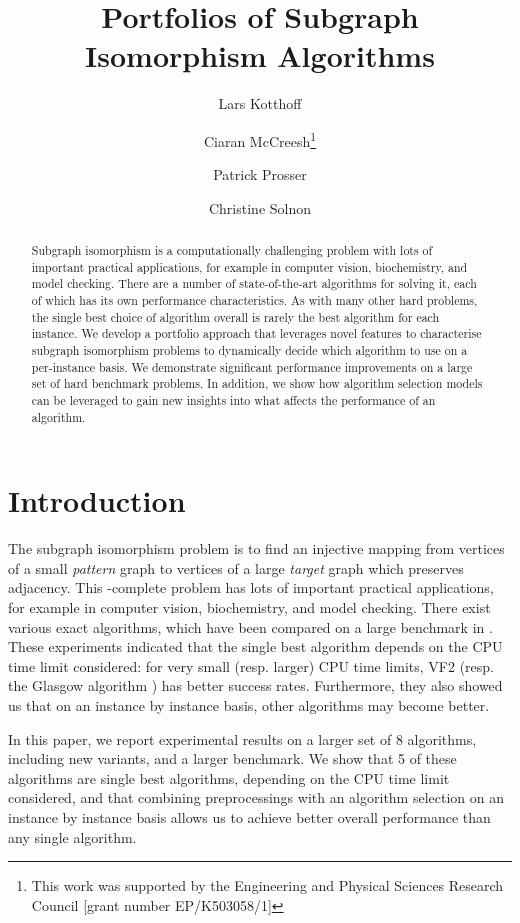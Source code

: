 \documentclass{llncs}
\title{Portfolios of Subgraph Isomorphism Algorithms}
\author{
    Lars Kotthoff\inst{1}
    \and Ciaran McCreesh\thanks{This work was supported by the Engineering
        and Physical Sciences Research Council [grant number EP/K503058/1]}\inst{2}
    \and Patrick Prosser\inst{2}
    \and Christine Solnon\inst{3}}
\institute{
    University of British Columbia, Vancouver, Canada
    \and University of Glasgow, Glasgow, Scotland
    \and INSA-Lyon, LIRIS, UMR5205, F-69621, France}
\begin{document}
\maketitle

\begin{abstract}
Subgraph isomorphism is a computationally challenging problem with lots of important practical applications, for example in computer vision, biochemistry, and model checking. There are a number of state-of-the-art algorithms for solving it, each of which has its own performance characteristics. As with many other hard problems, the single best choice of algorithm overall is rarely the best algorithm for each instance. We develop a portfolio approach that leverages novel features to characterise subgraph isomorphism problems to dynamically decide which algorithm to use on a per-instance basis. We demonstrate significant performance improvements on a large set of hard benchmark problems. In addition, we show how algorithm selection models can be leveraged to gain new insights into what affects the performance of an algorithm.\end{abstract}

\section{Introduction}

The subgraph isomorphism problem is to find an injective mapping from vertices of a small \emph{pattern} graph to vertices of a large \emph{target} graph which preserves adjacency. This \NP-complete problem has lots of important practical applications, for example in computer vision, biochemistry, and model checking. There exist various exact algorithms, which have been compared on a large benchmark in  \cite{McCreesh:2015}. These experiments indicated that the single best algorithm depends on the CPU time limit considered: for very small (resp. larger) CPU time limits, VF2 \cite{Cordella:2004} (resp. the Glasgow algorithm \cite{McCreesh:2015}) has better success rates. Furthermore, they also showed us that on an instance by instance basis, other algorithms may become better.

In this paper, we report experimental results on a larger set of 8 algorithms, including new variants, and a larger benchmark. We show that 5 of these algorithms are single best algorithms, depending on the CPU time limit considered, and that combining preprocessings with an algorithm selection on an instance by instance basis allows us to achieve better overall performance than any single algorithm.
\end{document}
